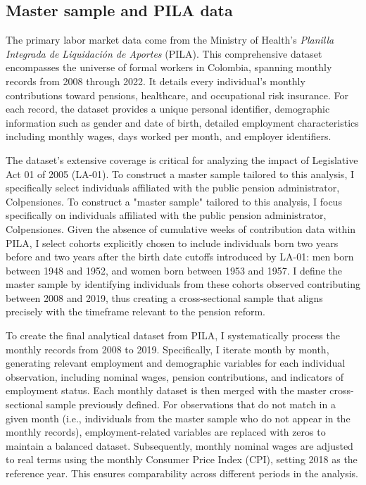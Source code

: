 \documentclass[12pt, a4paper]{article}
\begin{document}
\subsection{Master sample and PILA data}

The primary labor market data come from the Ministry of Health’s \textit{Planilla Integrada de Liquidación de Aportes} (PILA). This comprehensive dataset encompasses the universe of formal workers in Colombia, spanning monthly records from 2008 through 2022. It details every individual’s monthly contributions toward pensions, healthcare, and occupational risk insurance. For each record, the dataset provides a unique personal identifier, demographic information such as gender and date of birth, detailed employment characteristics including monthly wages, days worked per month, and employer identifiers.

The dataset’s extensive coverage is critical for analyzing the impact of Legislative Act 01 of 2005 (LA-01). To construct a master sample tailored to this analysis, I specifically select individuals affiliated with the public pension administrator, Colpensiones. To construct a "master sample" tailored to this analysis, I focus specifically on individuals affiliated with the public pension administrator, Colpensiones. Given the absence of cumulative weeks of contribution data within PILA, I select cohorts explicitly chosen to include individuals born two years before and two years after the birth date cutoffs introduced by LA-01: men born between 1948 and 1952, and women born between 1953 and 1957. I define the master sample by identifying individuals from these cohorts observed contributing between 2008 and 2019, thus creating a cross-sectional sample that aligns precisely with the timeframe relevant to the pension reform.

To create the final analytical dataset from PILA, I systematically process the monthly records from 2008 to 2019. Specifically, I iterate month by month, generating relevant employment and demographic variables for each individual observation, including nominal wages, pension contributions, and indicators of employment status. Each monthly dataset is then merged with the master cross-sectional sample previously defined. For observations that do not match in a given month (i.e., individuals from the master sample who do not appear in the monthly records), employment-related variables are replaced with zeros to maintain a balanced dataset. Subsequently, monthly nominal wages are adjusted to real terms using the monthly Consumer Price Index (CPI), setting 2018 as the reference year. This ensures comparability across different periods in the analysis.
\end{document}
